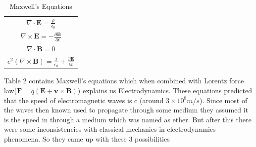 \documentclass[12pt,a4paper]{article}
\numberwithin{table}{section}
\numberwithin{figure}{section}
\numberwithin{equation}{section}
\theoremstyle{remark}
\theoremstyle{definition}
\begin{document}
\begin{table}[h!]
\begin{center}
\begin{tabular}{|c|}

\hline
$
\nabla \cdot \textbf{E}=\frac{\rho}{\epsilon_0}
$\\ 
$
\nabla \times \textbf{E}=- \frac{\partial \textbf{B}}{\partial t}
$\\  

$\nabla \cdot \textbf{B}=0
$\\
$c^2(\nabla \times \textbf{B})={\frac{j}{\epsilon_0}+\frac{\partial \textbf{E}}{\partial t}}$
\\
\hline

\end{tabular}
\caption{Maxwell's Equations}
 \label{table:1}

\end{center}
\end{table}
Table 2 contains Maxwell's equations which when combined with Lorentz force law($\textbf{F}=q(\textbf{E} +\textbf{v} \times \textbf{B} )$) explains us Electrodynamics. These equations predicted that the speed of electromagnetic waves is c (around $3\times 10^8m/s$). Since most of the waves then known used to propagate through some medium they assumed it is the speed in through a medium which was named as ether.  But after this there were some inconsistencies with classical mechanics in electrodynamics phenomena. So they came up with these 3 possibilities
\end{document}

